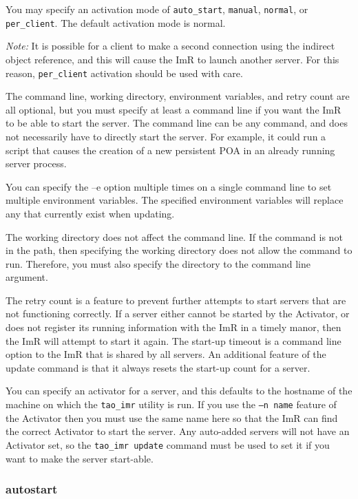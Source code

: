 You may specify an activation mode of {\tt auto_start}, {\tt manual},
{\tt normal},  or {\tt per_client}. The default activation mode is normal.

\emph {Note:} It is possible for a client to make a second connection
using the indirect object reference, and this will cause the ImR to launch
another server. For this reason, {\tt per_client} activation should be used
with care.

The command line, working directory, environment variables, and retry
count are all optional, but you must specify at least a command line if
you want the ImR to be able to start the server. The command line can
be any command, and does not necessarily have to directly start the server.
For example, it could run a script that causes the creation of a new persistent
POA in an already running server process.

You can specify the –e option multiple times on a single command line to
set multiple environment variables. The specified environment variables
will replace any that currently exist when updating.

The working directory does not affect the command line. If the command
is not in the path, then specifying the working directory does not allow the
command to run. Therefore, you must also specify the directory to the
command line argument.

The retry count is a feature to prevent further attempts to start servers that
are not functioning correctly. If a server either cannot be started by the
Activator, or does not register its running information with the ImR in a timely
manor, then the ImR will attempt to start it again. The start-up timeout is a
command line option to the ImR that is shared by all servers. An additional
feature of the update command is that it always resets the start-up count for
a server.

You can specify an activator for a server, and this defaults to the hostname
of the machine on which the {\tt tao\_imr} utility is run. If you use the
{\tt –n name} feature of the Activator then you must use the same name
here so that the ImR can find the correct Activator to start the server.
Any auto-added servers will not have an Activator set, so the
{\tt tao\_imr update} command must be used to set it if you want to make
the server start-able.

\subsubsection{autostart}

